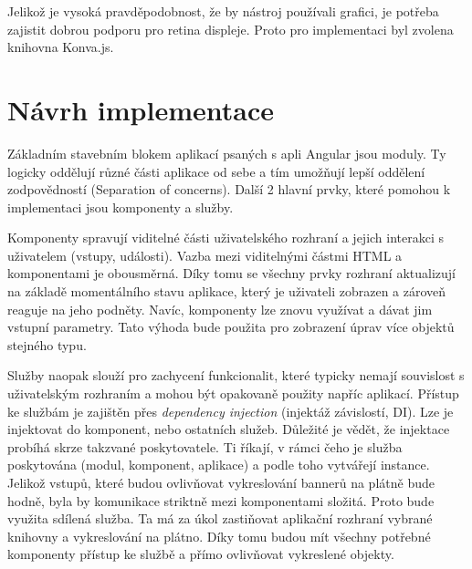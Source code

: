             Jelikož je vysoká pravděpodobnost, že by nástroj používali grafici, je potřeba zajistit dobrou podporu pro retina displeje.
            Proto pro implementaci byl zvolena knihovna Konva.js.

    \section{Návrh implementace}\label{sec:implementation-design}
    Základním stavebním blokem aplikací psaných s apli Angular jsou moduly. Ty logicky oddělují různé části aplikace od sebe a tím umožňují lepší oddělení 
    zodpovědností (Separation of concerns). Další 2 hlavní prvky, které pomohou k implementaci jsou komponenty a služby.  

    Komponenty spravují viditelné části uživatelského rozhraní a jejich interakci s uživatelem (vstupy, události).
    Vazba mezi viditelnými částmi HTML a komponentami je obousměrná. Díky tomu se všechny prvky rozhraní aktualizují na základě momentálního stavu aplikace,
    který je uživateli zobrazen a zároveň reaguje na jeho podněty. Navíc, komponenty lze znovu využívat a dávat jim vstupní parametry.
    Tato výhoda bude použita pro zobrazení úprav více objektů stejného typu. 

    Služby naopak slouží pro zachycení funkcionalit, které typicky nemají souvislost s uživatelským rozhraním a mohou být opakovaně použity napříc aplikací.
    Přístup ke službám je zajištěn přes \emph{dependency injection} (injektáž závislostí, DI). Lze je injektovat do komponent, nebo ostatních služeb.
    Důležité je vědět, že injektace probíhá skrze takzvané poskytovatele. Ti říkají, v rámci čeho je služba poskytována (modul, komponent, aplikace) a
    podle toho vytvářejí instance. Jelikož vstupů, které budou ovlivňovat vykreslování bannerů na plátně bude hodně,
    byla by komunikace striktně mezi komponentami složitá. Proto bude využita sdílená služba.
    Ta má za úkol zastiňovat aplikační rozhraní vybrané knihovny a vykreslování na plátno. Díky tomu budou mít všechny potřebné komponenty přístup ke službě a
    přímo ovlivňovat vykreslené objekty.

